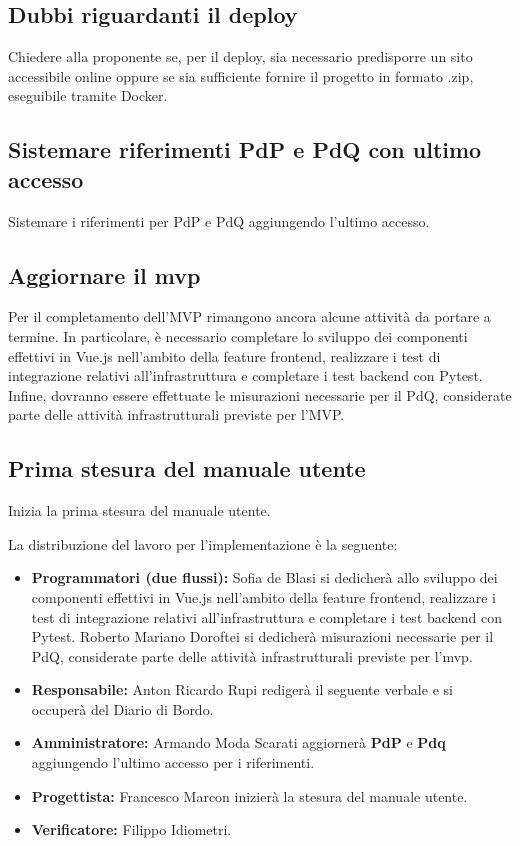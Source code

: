 \subsection{Dubbi riguardanti il deploy}
Chiedere alla proponente se, per il deploy, 
sia necessario predisporre un sito accessibile online oppure se 
sia sufficiente fornire il progetto in formato .zip, 
eseguibile tramite Docker.

\subsection{Sistemare riferimenti PdP e PdQ con ultimo accesso}
Sistemare i riferimenti per PdP e PdQ aggiungendo l'ultimo accesso.

\subsection{Aggiornare il mvp}
Per il completamento dell’MVP rimangono ancora alcune attività da portare a termine.
In particolare, è necessario completare lo sviluppo dei componenti effettivi in Vue.js 
nell’ambito della feature frontend, realizzare i test di integrazione relativi all’infrastruttura 
e completare i test backend con Pytest. Infine, dovranno essere effettuate le 
misurazioni necessarie per il PdQ, considerate parte delle attività infrastrutturali previste per l’MVP.

\subsection{Prima stesura del manuale utente}
Inizia la prima stesura del manuale utente.


La distribuzione del lavoro per l'implementazione è la seguente:
\begin{itemize}
	\item \textbf{Programmatori (due flussi):} Sofia de Blasi si dedicherà allo sviluppo dei componenti effettivi in Vue.js 
	nell’ambito della feature frontend, realizzare i test di integrazione relativi all’infrastruttura e completare i test backend con Pytest. 
	Roberto Mariano Doroftei si dedicherà misurazioni necessarie per il PdQ, considerate parte delle attività infrastrutturali previste per l’mvp.
	\item \textbf{Responsabile:} Anton Ricardo Rupi redigerà il seguente verbale e si occuperà del Diario di Bordo.
	\item \textbf{Amministratore:} Armando Moda Scarati aggiornerà \textbf{PdP} e \textbf{Pdq} aggiungendo l'ultimo accesso per i riferimenti.
	\item \textbf{Progettista:} Francesco Marcon inizierà la stesura del manuale utente.
	\item \textbf{Verificatore:} Filippo Idiometri.
\end{itemize}

